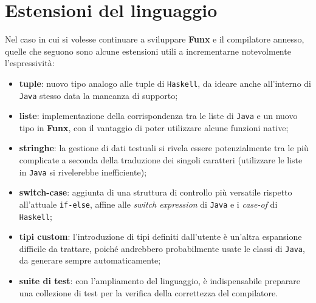 \section{Estensioni del linguaggio}
\label{sec:6-2-language-extensions}

Nel caso in cui si volesse continuare a sviluppare \textbf{Funx} e il compilatore annesso,
quelle che seguono sono alcune estensioni utili a incrementarne notevolmente l'espressività:
\begin{itemize}
    \item \textbf{tuple}: nuovo tipo analogo alle tuple di \texttt{Haskell}, da ideare anche all'interno di \texttt{Java}
          stesso data la mancanza di supporto;
    \item \textbf{liste}: implementazione della corrispondenza tra le liste di \texttt{Java} e un nuovo tipo in \textbf{Funx},
          con il vantaggio di poter utilizzare alcune funzioni native;
    \item \textbf{stringhe}: la gestione di dati testuali si rivela essere potenzialmente tra le più complicate a seconda
          della traduzione dei singoli caratteri (utilizzare le liste in \texttt{Java} si rivelerebbe inefficiente);
    \item \textbf{switch-case}: aggiunta di una struttura di controllo più versatile rispetto all'attuale \texttt{if-else},
          affine alle \textit{switch expression} di \texttt{Java} e i \textit{case-of} di \texttt{Haskell};
    \item \textbf{tipi custom}: l'introduzione di tipi definiti dall'utente è un'altra espansione difficile da trattare,
          poiché andrebbero probabilmente usate le classi di \texttt{Java}, da generare sempre automaticamente;
    \item \textbf{suite di test}: con l'ampliamento del linguaggio, è indispensabile preparare una collezione di test
          per la verifica della correttezza del compilatore.
\end{itemize}